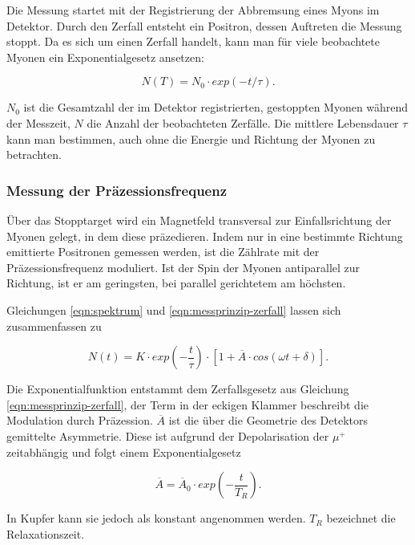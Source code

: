 \documentclass[a4paper,ngerman]{scrartcl}
\begin{document}
Die Messung startet mit der Registrierung der Abbremsung eines Myons im Detektor. Durch den Zerfall entsteht ein Positron, dessen Auftreten die Messung stoppt. Da es sich um einen Zerfall handelt, kann man für viele beobachtete Myonen ein Exponentialgesetz ansetzen:

\begin{equation}
\label{eqn:messprinzip-zerfall}
N(T) = N_0 \cdot exp(-t / \tau) .
\end{equation} 
	
$N_0$ ist die Gesamtzahl der im Detektor registrierten, gestoppten Myonen während der Messzeit, $N$ die Anzahl der beobachteten Zerfälle.
Die mittlere Lebensdauer $\tau$ kann man bestimmen, auch ohne die Energie und Richtung der Myonen zu betrachten. 

\subsubsection*{Messung der Präzessionsfrequenz}


Über das Stopptarget wird ein Magnetfeld transversal zur Einfallsrichtung der Myonen gelegt, in dem diese präzedieren.
Indem nur in eine bestimmte Richtung emittierte Positronen gemessen werden, ist die Zählrate mit der Präzessionsfrequenz moduliert. Ist der Spin der Myonen antiparallel zur Richtung, ist er am geringsten, bei parallel gerichtetem am höchsten.


Gleichungen \ref{eqn:spektrum} und \ref{eqn:messprinzip-zerfall}
lassen sich zusammenfassen zu

\begin{equation}
N(t) = K \cdot exp(- \frac{t}{\tau}) \cdot \left[ 1 + \overline{A} \cdot cos(\omega t + \delta) \right] .
\end{equation}

Die Exponentialfunktion entstammt dem Zerfallsgesetz aus Gleichung \ref{eqn:messprinzip-zerfall}, der Term in der eckigen Klammer beschreibt die Modulation durch Präzession.
$\overline{A}$ ist die über die Geometrie des Detektors gemittelte Asymmetrie. Diese ist aufgrund der Depolarisation der $\mu^{+}$ zeitabhängig und folgt einem Exponentialgesetz

\begin{equation}
\overline{A} = \overline{A}_0 \cdot exp(- \frac{t}{ T_R }) .
\end{equation}

In Kupfer kann sie jedoch als konstant angenommen werden. $T_R$ bezeichnet die Relaxationszeit.
	
\end{document}
